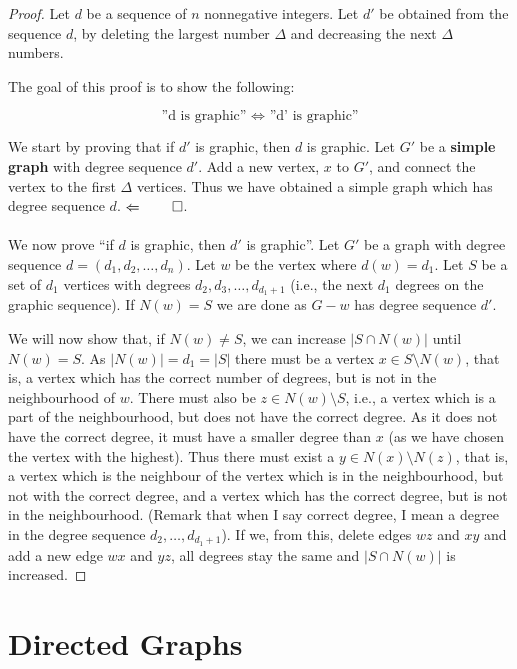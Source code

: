 \begin{proof}
	Let $d$ be a sequence of $n$ nonnegative integers. Let $d'$ be obtained from the sequence $d$, by deleting the largest number \(\Delta\) and decreasing the next \(\Delta\) numbers.

	The goal of this proof is to show the following:

	\begin{equation*}
		\text{''d is graphic'' } \iff \text{ ''d' is graphic''}
	\end{equation*}

	We start by proving that if $d'$ is graphic, then $d$ is graphic. Let $G'$ be a \textbf{simple graph} with degree sequence $d'$. Add a new vertex, $x$ to $G'$, and connect the vertex to the first \(\Delta\) vertices. Thus we have obtained a simple graph which has degree sequence $d$.
	$\Leftarrow \qed$.\\\\
	\noindent
	We now prove ``if $d$ is graphic, then $d'$ is graphic''. Let $G'$ be a graph with degree sequence $d = (d_{1}, d_{2}, \ldots, d_{n})$. Let $w$ be the vertex where $d(w) = d_{1}$. Let $S$ be a set of $d_{1}$ vertices with degrees $d_{2}, d_{3}, \ldots, d_{d_{1}+1}$ (i.e., the next $d_{1}$ degrees on the graphic sequence). If $N(w) = S$ we are done as $G - w$ has degree sequence $d'$.

	We will now show that, if $N(w) \ne S$, we can increase $|S \cap N(w)|$ until $N(w) = S$. As $|N(w)| = d_{1} = |S|$ there must be a vertex $x \in S \setminus N(w)$, that is, a vertex which has the correct number of degrees, but is not in the neighbourhood of $w$. There must also be $z \in N(w) \setminus S$, i.e., a vertex which is a part of the neighbourhood, but does not have the correct degree. As it does not have the correct degree, it must have a smaller degree than $x$ (as we have chosen the vertex with the highest). Thus there must exist a $y \in N(x) \setminus N(z)$, that is, a vertex which is the neighbour of the vertex which is in the neighbourhood, but not with the correct degree, and a vertex which has the correct degree, but is not in the neighbourhood. (Remark that when I say correct degree, I mean a degree in the degree sequence $d_{2}, \ldots, d_{d_{1}+1}$). If we, from this, delete edges $wz$ and $xy$ and add a new edge $wx$ and $yz$, all degrees stay the same and $|S \cap N(w)|$ is increased.
\end{proof}

\section{Directed Graphs}%
\label{sec:1.4}


